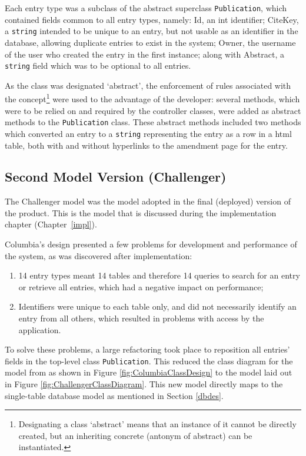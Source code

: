 Each entry type was a subclass of the abstract superclass \texttt{Publication}, which contained fields common to all entry types, namely: Id, an int identifier; CiteKey, a \texttt{string} intended to be unique to an entry, but not usable as an identifier in the database, allowing duplicate entries to exist in the system; Owner, the username of the user who created the entry in the first instance; along with Abstract, a \texttt{string} field which was to be optional to all entries.

As the class was designated `abstract', the enforcement of rules associated with the concept\footnote{Designating a class `abstract' means that an instance of it cannot be directly created, but an inheriting concrete (antonym of abstract) can be instantiated.} were used to the advantage of the developer: several methods, which were to be relied on and required by the controller classes, were added as abstract methods to the \texttt{Publication} class.  These abstract methods included two methods which converted an entry to a \texttt{string} representing the entry as a row in a \gls{html} table, both with and without hyperlinks to the amendment page for the entry.


\subsection{Second Model Version (Challenger)}
\label{designChallenger}
The Challenger model was the model adopted in the final (deployed) version of the product.  This is the model that is discussed during the implementation chapter (Chapter~\ref{impl}).

Columbia's design presented a few problems for development and performance of the system, as was discovered after implementation:
\begin{enumerate}
	\item 14 entry types meant 14 tables and therefore 14 queries to search for an entry or retrieve all entries, which had a negative impact on performance;
	\item Identifiers were unique to each table only, and did not necessarily identify an entry from all others, which resulted in problems with access by the application.
\end{enumerate}

To solve these problems, a large refactoring took place to reposition all entries' fields in the top-level class \texttt{Publication}.  This reduced the class diagram for the model from as shown in Figure \ref{fig:ColumbiaClassDesign} to the model laid out in Figure \ref{fig:ChallengerClassDiagram}.  This new model directly maps to the single-table database model as mentioned in Section \ref{dbdes}.

